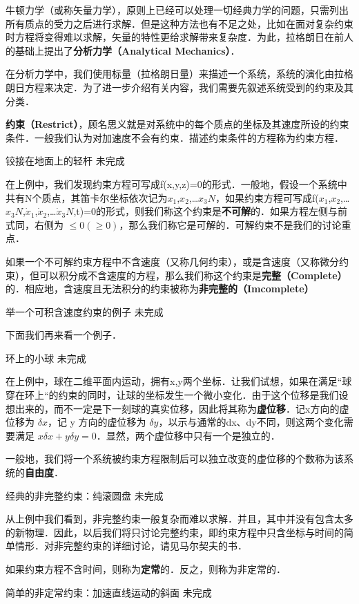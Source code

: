 
\begin{issues}
\issueDraft
\issueTODO
\end{issues}


牛顿力学（或称矢量力学），原则上已经可以处理一切经典力学的问题，只需列出所有质点的受力之后进行求解．但是这种方法也有不足之处，比如在面对复杂约束时方程将变得难以求解，矢量的特性更给求解带来复杂度．为此，拉格朗日在前人的基础上提出了\textbf{分析力学（Analytical Mechanics）}．

在分析力学中，我们使用标量（拉格朗日量）来描述一个系统，系统的演化由拉格朗日方程来决定．为了进一步介绍有关内容，我们需要先叙述系统受到的约束及其分类．

\textbf{约束（Restrict）}，顾名思义就是对系统中的每个质点的坐标及其速度所设的约束条件．一般我们认为对加速度不会有约束．描述约束条件的方程称为约束方程．

\begin{example}{铰接在地面上的轻杆}
未完成
\end{example}

在上例中，我们发现约束方程可写成f(x,y,z)=0的形式．一般地，假设一个系统中共有N个质点，其笛卡尔坐标依次记为$x
_1$,$x_2$,…$x_3N$，如果约束方程可写成f($x_1$,$x_2$,…$x_3N$,$\dot x_1$,$\dot x_2$,…$\dot x_3N$,t)=0的形式，则我们称这个约束是\textbf{不可解}的．如果方程左侧与前式同，右侧为 $\leq 0(\geqslant 0)$，那么我们称它是可解的．可解约束不是我们的讨论重点．

如果一个不可解约束方程中不含速度（又称几何约束），或是含速度（又称微分约束），但可以积分成不含速度的方程，那么我们称这个约束是\textbf{完整（Complete）}的．相应地，含速度且无法积分的约束被称为\textbf{非完整的（Imcomplete）}

\begin{example}{举一个可积含速度约束的例子}
未完成
\end{example}

下面我们再来看一个例子．

\begin{example}{环上的小球}
未完成
\end{example}

在上例中，球在二维平面内运动，拥有x,y两个坐标．让我们试想，如果在满足“球穿在环上“的约束的同时，让球的坐标发生一个微小变化．由于这个位移是我们设想出来的，而不一定是下一刻球的真实位移，因此将其称为\textbf{虚位移}．记x方向的虚位移为 $\delta x$，记 y 方向的虚位移为 $\delta y$，以示与通常的dx、dy不同，则这两个变化需要满足 $x\delta x+y\delta y=0$．显然，两个虚位移中只有一个是独立的．

一般地，我们将一个系统被约束方程限制后可以独立改变的虚位移的个数称为该系统的\textbf{自由度}．

\begin{example}{经典的非完整约束：纯滚圆盘}
未完成
\end{example}

从上例中我们看到，非完整约束一般复杂而难以求解．并且，其中并没有包含太多的新物理．因此，以后我们将只讨论完整约束，即约束方程中只含坐标与时间的简单情形．对非完整约束的详细讨论，请见马尔契夫的书．

如果约束方程不含时间，则称为\textbf{定常}的．反之，则称为非定常的．

\begin{example}{简单的非定常约束：加速直线运动的斜面}
未完成
\end{example}